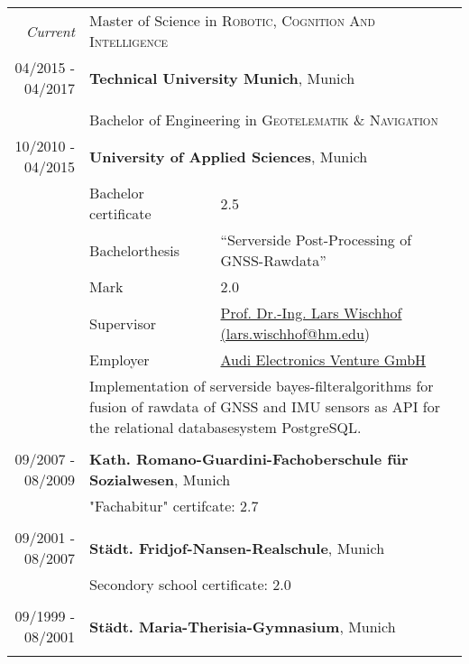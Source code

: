 \documentclass[a4paper,10pt]{article} %
\begin{document}
\begin{tabular}{r|l@{: }p{11cm}}
\emph{Current} & \multicolumn{2}{p{11cm}}{Master of Science in \textsc{Robotic, Cognition And Intelligence}}\\
\textsc{04/2015 - 04/2017} & \multicolumn{2}{p{11cm}}{\textbf{Technical University Munich}, Munich} \\
\multicolumn{3}{c}{}\\
& \multicolumn{2}{p{11cm}}{Bachelor of Engineering in \textsc{Geotelematik \& Navigation}}\\
\textsc{10/2010 - 04/2015} & \multicolumn{2}{p{11cm}}{\textbf{University of Applied Sciences}, Munich} \\
                           $$& \small Bachelor certificate & \small 2.5\\
                           & \small Bachelorthesis & \small ``Serverside Post-Processing of GNSS-Rawdata'' \\
                           & \small Mark           & \small 2.0\\
                           & \small Supervisor     & \small \href{mailto:lars.wischhof@hm.edu}{Prof. Dr.-Ing. Lars Wischhof (lars.wischhof@hm.edu})\\
                           & \small Employer       & \small \href{http://www.audi-electronics-venture.de}{Audi Electronics Venture GmbH} \\
                           & \multicolumn{2}{p{11cm}}{\small Implementation of serverside bayes-filteralgorithms for fusion of rawdata of GNSS and IMU sensors as API for the relational databasesystem PostgreSQL.}\\
\multicolumn{3}{c}{}\\
 
 
\textsc{09/2007 - 08/2009} & \multicolumn{2}{p{11cm}}{\textbf{Kath. Romano-Guardini-Fachoberschule für Sozialwesen}, Munich} \\
                           & \multicolumn{2}{p{11cm}}{\small "Fachabitur" certifcate: 2.7}                                         \\
\multicolumn{3}{c}{}                                                                                \\
 
 
\textsc{09/2001 - 08/2007} & \multicolumn{2}{p{11cm}}{\textbf{Städt. Fridjof-Nansen-Realschule}, Munich} \\
                           & \multicolumn{2}{p{11cm}}{\small Secondory school certificate: 2.0} \\
\multicolumn{3}{c}{}\\
 
 
\textsc{09/1999 - 08/2001} & \multicolumn{2}{p{11cm}}{\textbf{Städt. Maria-Therisia-Gymnasium}, Munich} \\
\multicolumn{3}{c}{}\\
\end{tabular}
 
\end{document}
